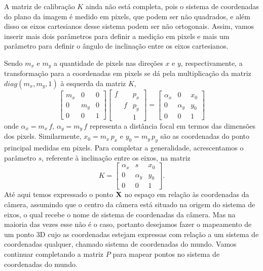 A matriz de calibração $K$ ainda não está completa, pois o sistema de coordenadas do plano da imagem é medido em pixels, que podem ser não quadrados, e além disso os eixos cartesianos desse sistema podem ser não ortogonais. Assim, vamos inserir mais dois parâmetros para definir a medição em pixels e mais um parâmetro para definir o ângulo de inclinação entre os eixos cartesianos.

Sendo $m_x$ e $m_y$ a quantidade de pixels nas direções $x$ e $y$, respectivamente, a transformação para a coordenadas em pixels se dá pela multiplicação da matriz $diag(m_x,m_y,1)$ à esquerda da matriz $K$,
\begin{equation*}
\begin{bmatrix}
m_x&0&0\\
0&m_y&0\\
0&0&1
\end{bmatrix}      
\begin{bmatrix}
f& &p_x\\
&f&p_y\\
& &1
\end{bmatrix}
=
\begin{bmatrix}
\alpha_x&0&x_0\\
0&\alpha_y&y_0\\
0&0&1
\end{bmatrix}
\end{equation*}
onde $\alpha_x=m_x\,f$, $\alpha_y=m_y\,f$ representa a distância focal em termos das dimensões dos pixels. Similarmente, $x_0=m_x\,p_x$ e $y_0=m_y\,p_y$ são as coordenadas do ponto principal medidas em pixels. Para completar a generalidade, acrescentamos o parâmetro $s$, referente à inclinação entre os eixos, na matriz
\begin{equation*}
K=
\begin{bmatrix}
\alpha_x&s&x_0\\
0&\alpha_y&y_0\\
0&0&1
\end{bmatrix}.
\end{equation*}
Até aqui temos expressado o ponto $\mathbf{X}$ no espaço em relação às coordenadas da câmera, assumindo que o centro da câmera está situado na origem do sistema de eixos, o qual recebe o nome de sistema de coordenadas da câmera. Mas na maioria das vezes esse não é o caso, portanto desejamos fazer o mapeamento de um ponto 3D cujo as coordenadas estejam expressas com relação a um sistema de coordenadas qualquer, chamado sistema de coordenadas do mundo. Vamos continuar completando a matriz $P$ para mapear pontos no sistema de coordenadas do mundo.

